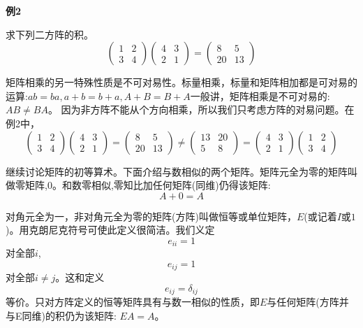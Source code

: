 \vspace{0.5cm}

\textbf{例2}

求下列二方阵的积。
\[
\begin{pmatrix}
    1 & 2 \\
    3 & 4
\end{pmatrix}      
\begin{pmatrix}
    4 & 3 \\
    2 & 1
\end{pmatrix} 
=
\begin{pmatrix}
    8 & 5 \\
    20 & 13
\end{pmatrix}   
\]

矩阵相乘的另一特殊性质是不可对易性。标量相乘，标量和矩阵相加都是可对易的运算:$ab=ba,a+b=b+a,A+B=B+A$一般讲，矩阵相乘是不可对易的:$AB \neq BA$。
因为非方阵不能从个方向相乘，所以我们只考虑方阵的对易问题。在例2中，
\[
\begin{pmatrix}
    1 & 2 \\
    3 & 4
\end{pmatrix}      
\begin{pmatrix}
    4 & 3 \\
    2 & 1
\end{pmatrix} 
=
\begin{pmatrix}
    8 & 5 \\
    20 & 13
\end{pmatrix}   
\neq
\begin{pmatrix}
    13 & 20 \\
    5 & 8
\end{pmatrix}   
=   
\begin{pmatrix}
    4 & 3 \\
    2 & 1
\end{pmatrix} 
\begin{pmatrix}
    1 & 2 \\
    3 & 4
\end{pmatrix}   
\]

继续讨论矩阵的初等算术。下面介绍与数相似的两个矩阵。矩阵元全为零的矩阵叫做零矩阵,0。和数零相似,零知比加任何矩阵(同维)仍得该矩阵:
\[A+0=A \tag{3-17}\]

对角元全为一，非对角元全为零的矩阵(方阵)叫做恒等或单位矩阵，$E$(或记着$I$或$1$)。用克朗尼克符号可使此定义很简洁。我们义定
\[e_{ii}=1 \tag{3-18a}\]
对全部$i$,
\[e_{ij}=1 \tag{3-18a}\]
对全部$i \neq j$。这和定义
\[e_{ij}=\delta_{ij}\]
等价。只对方阵定义的恒等矩阵具有与数一相似的性质，即$E$与任何矩阵(方阵并与E同维)的积仍为该矩阵: $EA=A$。


